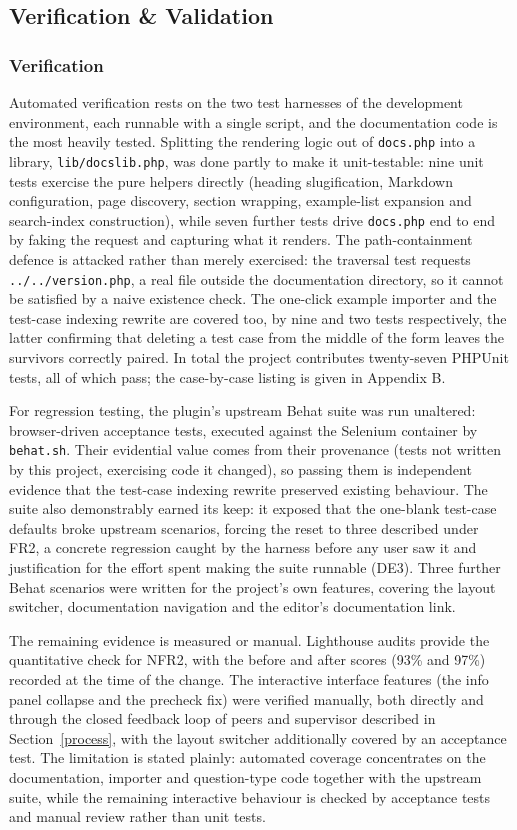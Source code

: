 \subsection{Verification \& Validation}

\subsubsection{Verification}
Automated verification rests on the two test harnesses of the development environment, each runnable with a single script, and the documentation code is the most heavily tested. Splitting the rendering logic out of \texttt{docs.php} into a library, \texttt{lib/docslib.php}, was done partly to make it unit-testable: nine unit tests exercise the pure helpers directly (heading slugification, Markdown configuration, page discovery, section wrapping, example-list expansion and search-index construction), while seven further tests drive \texttt{docs.php} end to end by faking the request and capturing what it renders. The path-containment defence is attacked rather than merely exercised: the traversal test requests \texttt{../../version.php}, a real file outside the documentation directory, so it cannot be satisfied by a naive existence check. The one-click example importer and the test-case indexing rewrite are covered too, by nine and two tests respectively, the latter confirming that deleting a test case from the middle of the form leaves the survivors correctly paired. In total the project contributes twenty-seven PHPUnit tests, all of which pass; the case-by-case listing is given in Appendix B.

For regression testing, the plugin's upstream Behat suite was run unaltered: browser-driven acceptance tests, executed against the Selenium container by \texttt{behat.sh}. Their evidential value comes from their provenance (tests not written by this project, exercising code it changed), so passing them is independent evidence that the test-case indexing rewrite preserved existing behaviour. The suite also demonstrably earned its keep: it exposed that the one-blank test-case defaults broke upstream scenarios, forcing the reset to three described under FR2, a concrete regression caught by the harness before any user saw it and justification for the effort spent making the suite runnable (DE3). Three further Behat scenarios were written for the project's own features, covering the layout switcher, documentation navigation and the editor's documentation link.

The remaining evidence is measured or manual. Lighthouse audits provide the quantitative check for NFR2, with the before and after scores (93\% and 97\%) recorded at the time of the change. The interactive interface features (the info panel collapse and the precheck fix) were verified manually, both directly and through the closed feedback loop of peers and supervisor described in Section~\ref{process}, with the layout switcher additionally covered by an acceptance test. The limitation is stated plainly: automated coverage concentrates on the documentation, importer and question-type code together with the upstream suite, while the remaining interactive behaviour is checked by acceptance tests and manual review rather than unit tests.

